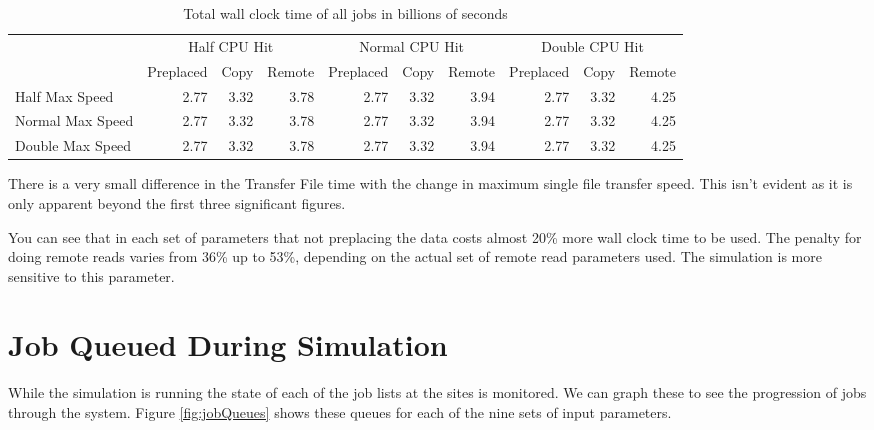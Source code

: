 \documentclass[a4paper]{jpconf}
\begin{document}
\begin{table}
  \begin{center}
    \begin{scriptsize}
      \begin{tabular}{|l|rrr|rrr|rrr|}
        \hline
        & \multicolumn{3}{|c|}{Half CPU Hit} & \multicolumn{3}{|c|}{Normal CPU
          Hit} & \multicolumn{3}{|c|}{Double CPU Hit} \\
        \cline{2-10}
        & Preplaced & Copy & Remote & Preplaced & Copy & Remote
        & Preplaced & Copy & Remote \\
        \hline
        Half Max Speed & 2.77 & 3.32 & 3.78 & 2.77 & 3.32 & 3.94 & 2.77
        & 3.32 & 4.25 \\
        Normal Max Speed & 2.77 & 3.32 & 3.78 & 2.77 & 3.32 & 3.94 & 2.77
        & 3.32 & 4.25 \\
        Double Max Speed & 2.77 & 3.32 & 3.78 & 2.77 & 3.32 & 3.94 & 2.77
        & 3.32 & 4.25 \\
        \hline
      \end{tabular}
      \caption{Total wall clock time of all jobs in billions of seconds\label{tab:wallClock}}
    \end{scriptsize}
  \end{center}
\end{table}

There is a very small difference in the Transfer File time with the
change in maximum single file transfer speed. This isn't evident as it
is only apparent beyond the first three significant figures.

You can see that in each set of parameters that not preplacing the
data costs almost 20\% more wall clock time to be used. The penalty
for doing remote reads varies from 36\% up to 53\%, depending on the
actual set of remote read parameters used. The simulation is more
sensitive to this parameter.

\section{Job Queued During Simulation}

While the simulation is running the state of each of the job lists at
the sites is monitored. We can graph these to see the progression of
jobs through the system. Figure \ref{fig:jobQueues} shows these queues
for each of the nine sets of input parameters.
\end{document}
